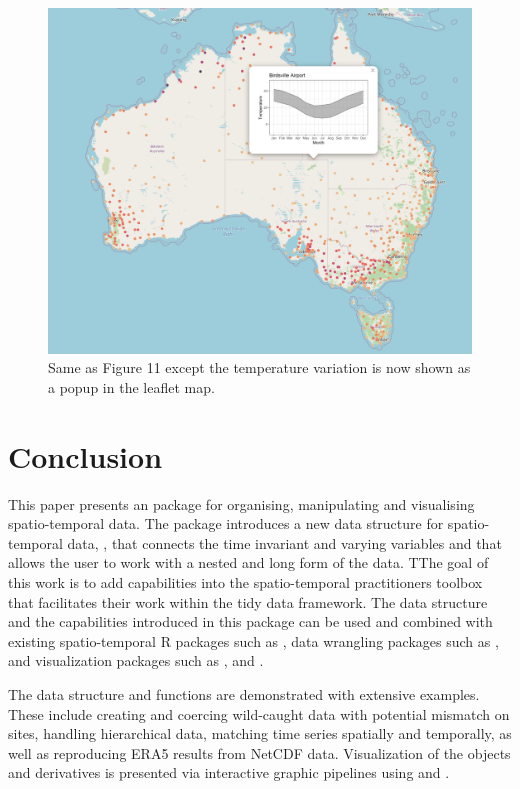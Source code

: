 \documentclass[
]{jss}
\begin{document}
\begin{CodeChunk}
\begin{figure}

{\centering \includegraphics[width=0.45\linewidth,height=0.25\textheight]{../figures/popup-mid} 

}

\caption[Same as Figure 11 except the temperature variation is now shown as a popup in the leaflet map]{Same as Figure 11 except the temperature variation is now shown as a popup in the leaflet map.}\label{fig:interactive-popup}
\end{figure}
\end{CodeChunk}

\hypertarget{conclude}{%
\section{Conclusion}\label{conclude}}

This paper presents an  package  for organising, manipulating and visualising spatio-temporal data. The package introduces a new data structure for spatio-temporal data, , that connects the time invariant and varying variables and that allows the user to work with a nested and long form of the data. TThe goal of this work is to add capabilities into the spatio-temporal practitioners toolbox that facilitates their work within the tidy data framework. The data structure and the capabilities introduced in this package can be used and combined with existing spatio-temporal R packages such as , data wrangling packages such as , and visualization packages such as ,  and .

The data structure and functions are demonstrated with extensive examples. These include creating and coercing wild-caught data with potential mismatch on sites, handling hierarchical data, matching time series spatially and temporally, as well as reproducing ERA5 results from NetCDF data. Visualization of the  objects and derivatives is presented via interactive graphic pipelines using  and .
\end{document}
